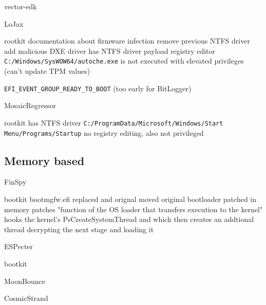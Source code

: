 vector-edk


LoJax


rootkit
documentation about firmware infection
remove previous NTFS driver
add malicious DXE driver
has NTFS driver
payload
registry editor
\lstinline{C:/Windows/SysWOW64/autoche.exe} is not executed with elevated privileges (can't update TPM values)

\lstinline{EFI_EVENT_GROUP_READY_TO_BOOT} (too early for BitLogger)


MosaicRegressor


rootkit
has NTFS driver
\lstinline{C:/ProgramData/Microsoft/Windows/Start Menu/Programs/Startup}
no registry editing, also not privileged

\subsection{Memory based}


FinSpy


bootkit
bootmgfw.efi replaced and orignal moved
original bootloader patched in memory
patches "function of the OS loader that transfers execution to the kernel"
hooks the kernel's PsCreateSystemThread and which then creates an addtional thread decrypting the next stage and loading it


ESPecter

bootkit


MoonBounce


CosmicStrand

